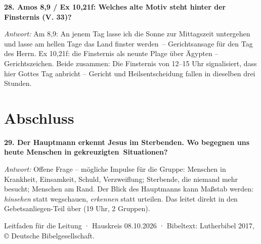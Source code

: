 \documentclass[12pt,a4paper]{article}
\newcommand{\frage}[1]{\par\vspace{0.7em}\noindent\textbf{#1}\par}
\newcommand{\antwort}[1]{\par\noindent\textit{Antwort:} #1\par}
\begin{document}
\frage{28. Amos 8,9 / Ex 10,21f: Welches alte Motiv steht hinter der Finsternis (V. 33)?}
\antwort{Am 8,9: \glqq An jenem Tag lasse ich die Sonne zur Mittagszeit untergehen und lasse am hellen Tage das Land finster werden\grqq\ -- Gerichtsansage für den Tag des Herrn. Ex 10,21f: die Finsternis als neunte Plage über Ägypten -- Gerichtszeichen. Beide zusammen: Die Finsternis von 12--15 Uhr signalisiert, dass hier Gottes Tag anbricht -- Gericht und Heilsentscheidung fallen in dieselben drei Stunden.}

\section*{Abschluss}

\frage{29. Der Hauptmann erkennt Jesus im Sterbenden. Wo begegnen uns heute Menschen in \glqq gekreuzigten\grqq\ Situationen?}
\antwort{Offene Frage -- mögliche Impulse für die Gruppe: Menschen in Krankheit, Einsamkeit, Schuld, Verzweiflung; Sterbende, die niemand mehr besucht; Menschen am Rand. Der Blick des Hauptmanns kann Maßstab werden: \emph{hinsehen} statt wegschauen, \emph{erkennen} statt urteilen. Das leitet direkt in den Gebetsanliegen-Teil über (19 Uhr, 2 Gruppen).}

\vspace{1em}
{\footnotesize Leitfaden für die Leitung · Hauskreis 08.10.2026 · Bibeltext: Lutherbibel 2017, © Deutsche Bibelgesellschaft.}
\end{document}
